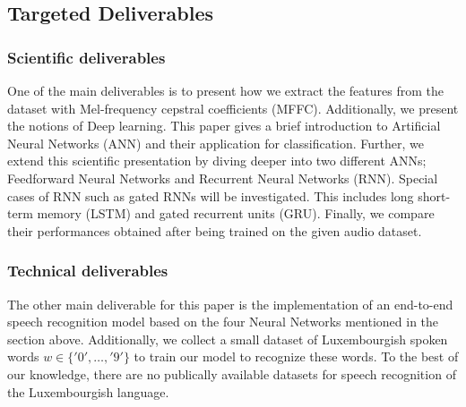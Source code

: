 
\subsection{Targeted Deliverables}

\subsubsection{Scientific deliverables}



One of the main deliverables is to present how we extract the features from the
dataset with Mel-frequency cepstral coefficients (MFFC). Additionally, we
present the notions of Deep learning. This paper gives a brief introduction to
Artificial Neural Networks (ANN) and their application for classification.
Further, we extend this scientific presentation by diving deeper into two
different ANNs; Feedforward Neural Networks and Recurrent Neural Networks (RNN).
Special cases of RNN such as gated RNNs will be investigated. This includes long
short-term memory (LSTM) and gated recurrent units (GRU). Finally, we compare
their performances obtained after being trained on the given audio dataset.

\subsubsection{Technical deliverables} 

The other main deliverable for this paper is the implementation of an end-to-end
speech recognition model based on the four Neural Networks mentioned in the
section above.  Additionally, we collect a small dataset of Luxembourgish spoken
words $w \in \{'0',\dots,'9'\}$ to train our model to recognize these
words. To the best of our knowledge, there are no publically available datasets
for speech recognition of the Luxembourgish language.
